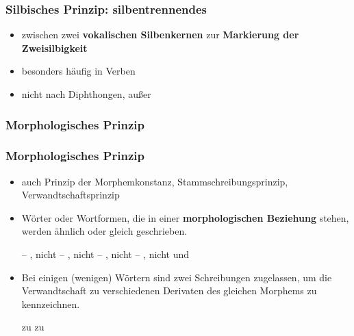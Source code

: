 \begin{frame}
\frametitle{Silbisches Prinzip: silbentrennendes }
	
	\begin{itemize}
	\item zwischen zwei \textbf{vokalischen Silbenkernen} zur \textbf{Markierung der Zweisilbigkeit}
	
	
	\eal
	\ex {}
	\ex {}
	\ex {}
	\zl

\pause
	
	\item besonders häufig in Verben
	\eal
	\ex {}
	\ex {}
	\zl
	
\pause
	
	\item nicht nach Diphthongen, außer 
	\eal
	\ex {}
	\ex {}
	\ex {}
	\ex {}
	\ex {}
	\zl

	\end{itemize}

\end{frame}


\subsubsection{Morphologisches Prinzip}

\begin{frame}
\frametitle{Morphologisches Prinzip}

\begin{itemize}
	\item auch Prinzip der Morphemkonstanz, Stammschreibungsprinzip, Verwandtschaftsprinzip
	
	\item Wörter oder Wortformen, die in einer \textbf{morphologischen Beziehung} stehen, werden ähnlich oder gleich geschrieben.
	
	\eal
	\ex {} -- , nicht 
	\ex {} -- , nicht 
	\ex {} -- , nicht 
	\ex {} -- , nicht  und 
	\zl

	\item Bei einigen (wenigen) Wörtern sind zwei Schreibungen zugelassen, um die Verwandtschaft zu verschiedenen Derivaten des gleichen Morphems zu kennzeichnen.
	
	\ea 
	\ea {} zu 
	\ex {} zu 
	\z
	\z 
\end{itemize}

\end{frame}


